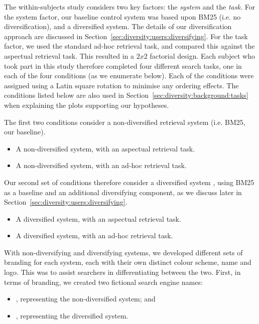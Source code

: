 The within-subjects study considers two key factors: the \emph{system} and the \emph{task.} For the system factor, our baseline control system was based upon BM25 (i.e. no diversification), and a diversified system. The details of our diversification approach are discussed in Section~\ref{sec:diversity:users:diversifying}. For the task factor, we used the standard ad-hoc retrieval task, and compared this against the aspectual retrieval task. This resulted in a $2x2$ factorial design. Each subject who took part in this study therefore completed four different search tasks, one in each of the four conditions (as we enumerate below). Each of the conditions were assigned using a Latin square rotation to minimise any ordering effects. The conditions listed below are also used in Section~\ref{sec:diversity:background:tasks} when explaining the plots supporting our hypotheses.

The first two conditions consider a non-diversified retrieval system  (i.e. BM25, our baseline).

\begin{itemize}
    \item{ A non-diversified system, with an aspectual retrieval task.}
    \item{ A non-diversified system, with an ad-hoc retrieval task.}
\end{itemize}

Our second set of conditions therefore consider a diversified system , using BM25 as a baseline and an additional diversifying component, as we discuss later in Section~\ref{sec:diversity:users:diversifying}.

\begin{itemize}
    \item{ A diversified system, with an aspectual retrieval task.}
    \item{ A diversified system, with an ad-hoc retrieval task.}
\end{itemize}

With non-diversifying and diversifying systems, we developed different sets of branding for each system, each with their own distinct colour scheme, name and logo. This was to assist searchers in differentiating between the two. First, in terms of branding, we created two fictional search engine names:

\begin{itemize}
    \item{\hula, representing the non-diversified  system; and}
    \item{\yoyo, representing the diversified  system.}
\end{itemize}

